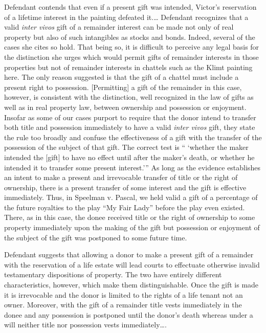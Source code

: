 Defendant contends that even if a present gift was intended, Victor's
reservation of a lifetime interest in the painting defeated it.\dots
Defendant recognizes that a valid \textit{inter vivos} gift of a remainder
interest can be made not only of real property but also of such intangibles as
stocks and bonds. Indeed, several of the cases she cites so hold. That being
so, it is difficult to perceive any legal basis for the distinction she urges
which would permit gifts of remainder interests in those properties but not of
remainder interests in chattels such as the Klimt painting here. The only
reason suggested is that the gift of a chattel must include a present right to
possession. [Permitting] a gift of the remainder in this case, however, is
consistent with the distinction, well recognized in the law of gifts as well as
in real property law, between ownership and possession or enjoyment. Insofar as
some of our cases purport to require that the donor intend to transfer both
title and possession immediately to have a valid \textit{inter vivos} gift,
they state the rule too broadly and confuse the effectiveness of a gift with
the transfer of the possession of the subject of that gift. The correct test is
`` `whether the maker intended the [gift] to have no effect until after the
maker's death, or whether he intended it to transfer some present
interest.'{}'' As long as the evidence establishes an intent to make a present
and irrevocable transfer of title or the right of ownership, there is a present
transfer of some interest and the gift is effective immediately. Thus, in
Speelman v. Pascal, we held valid a gift of a percentage of the future
royalties to the play ``My Fair Lady'' before the play even existed. There, as
in this case, the donee received title or the right of ownership to some
property immediately upon the making of the gift but possession or enjoyment of
the subject of the gift was postponed to some future time.

 Defendant suggests that allowing a donor to make a present gift of a remainder 
with the reservation of a life estate will lead courts to effectuate otherwise
invalid testamentary dispositions of property. The two have entirely different
characteristics, however, which make them distinguishable. Once the gift is
made it is irrevocable and the donor is limited to the rights of a life tenant
not an owner. Moreover, with the gift of a remainder title vests immediately in
the donee and any possession is postponed until the donor's death whereas under
a will neither title nor possession vests immediately\dots. 

